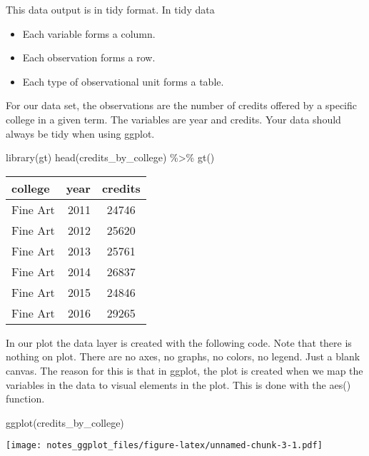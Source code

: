 \documentclass[
]{book}
\newenvironment{Shaded}{\begin{snugshade}}{\end{snugshade}}
\newcommand{\FunctionTok}[1]{\textcolor[rgb]{0.00,0.00,0.00}{#1}}
\newcommand{\NormalTok}[1]{#1}
\newcommand{\SpecialCharTok}[1]{\textcolor[rgb]{0.00,0.00,0.00}{#1}}
\providecommand{\tightlist}{%
  \setlength{\itemsep}{0pt}\setlength{\parskip}{0pt}}
\begin{document}
This data output is in tidy format. In tidy data

\begin{itemize}
\tightlist
\item
  Each variable forms a column.
\item
  Each observation forms a row.
\item
  Each type of observational unit forms a table.
\end{itemize}

For our data set, the observations are the number of credits offered by a specific
college in a given term. The variables are year and credits. Your data should always be tidy when using ggplot.

\begin{Shaded}
\begin{Highlighting}[]
\FunctionTok{library}\NormalTok{(gt)}
\FunctionTok{head}\NormalTok{(credits\_by\_college) }\SpecialCharTok{\%\textgreater{}\%} \FunctionTok{gt}\NormalTok{()}
\end{Highlighting}
\end{Shaded}

\captionsetup[table]{labelformat=empty,skip=1pt}
\begin{longtable}{lrc}
\toprule
college & year & credits \\ 
\midrule
Fine Art & 2011 & 24746 \\ 
Fine Art & 2012 & 25620 \\ 
Fine Art & 2013 & 25761 \\ 
Fine Art & 2014 & 26837 \\ 
Fine Art & 2015 & 24846 \\ 
Fine Art & 2016 & 29265 \\ 
\bottomrule
\end{longtable}

In our plot the data layer is created with the following code. Note that there is nothing on plot. There are no axes, no graphs, no colors, no legend. Just a blank canvas. The reason for this is that in ggplot, the plot is created when we map the variables in the data to visual elements in the plot. This is done with the aes() function.

\begin{Shaded}
\begin{Highlighting}[]
\FunctionTok{ggplot}\NormalTok{(credits\_by\_college)}
\end{Highlighting}
\end{Shaded}

\texttt{[image: notes\_ggplot\_files/figure-latex/unnamed-chunk-3-1.pdf]}
\end{document}
